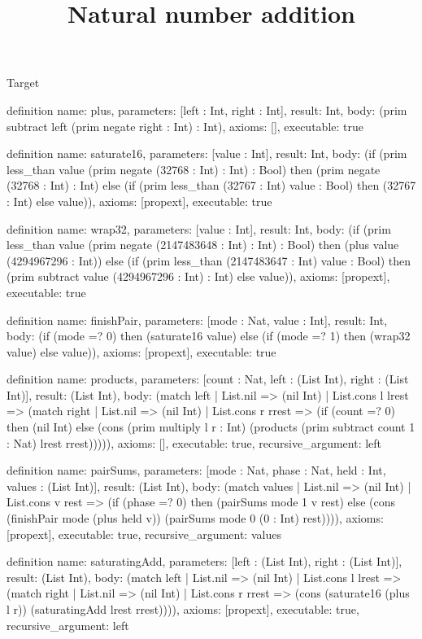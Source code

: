 \begin{lexlean}{Target}
\title{Natural number addition}
\begin{semanticmodule}
definition{
  name: plus,
  parameters: [left : Int, right : Int],
  result: Int,
  body: (prim subtract left (prim negate right : Int) : Int),
  axioms: [],
  executable: true
}

definition{
  name: saturate16,
  parameters: [value : Int],
  result: Int,
  body: (if (prim less_than value (prim negate (32768 : Int) : Int) : Bool) then (prim negate (32768 : Int) : Int) else (if (prim less_than (32767 : Int) value : Bool) then (32767 : Int) else value)),
  axioms: [propext],
  executable: true
}

definition{
  name: wrap32,
  parameters: [value : Int],
  result: Int,
  body: (if (prim less_than value (prim negate (2147483648 : Int) : Int) : Bool) then (plus value (4294967296 : Int)) else (if (prim less_than (2147483647 : Int) value : Bool) then (prim subtract value (4294967296 : Int) : Int) else value)),
  axioms: [propext],
  executable: true
}

definition{
  name: finishPair,
  parameters: [mode : Nat, value : Int],
  result: Int,
  body: (if (mode =? 0) then (saturate16 value) else (if (mode =? 1) then (wrap32 value) else value)),
  axioms: [propext],
  executable: true
}

definition{
  name: products,
  parameters: [count : Nat, left : (List Int), right : (List Int)],
  result: (List Int),
  body: (match left
    | List.nil => (nil Int)
    | List.cons l lrest => (match right
      | List.nil => (nil Int)
      | List.cons r rrest => (if (count =? 0) then (nil Int) else (cons (prim multiply l r : Int) (products (prim subtract count 1 : Nat) lrest rrest))))),
  axioms: [],
  executable: true,
  recursive_argument: left
}

definition{
  name: pairSums,
  parameters: [mode : Nat, phase : Nat, held : Int, values : (List Int)],
  result: (List Int),
  body: (match values
    | List.nil => (nil Int)
    | List.cons v rest => (if (phase =? 0) then (pairSums mode 1 v rest) else (cons (finishPair mode (plus held v)) (pairSums mode 0 (0 : Int) rest)))),
  axioms: [propext],
  executable: true,
  recursive_argument: values
}

definition{
  name: saturatingAdd,
  parameters: [left : (List Int), right : (List Int)],
  result: (List Int),
  body: (match left
    | List.nil => (nil Int)
    | List.cons l lrest => (match right
      | List.nil => (nil Int)
      | List.cons r rrest => (cons (saturate16 (plus l r)) (saturatingAdd lrest rrest)))),
  axioms: [propext],
  executable: true,
  recursive_argument: left
}


\end{semanticmodule}
\end{lexlean}
